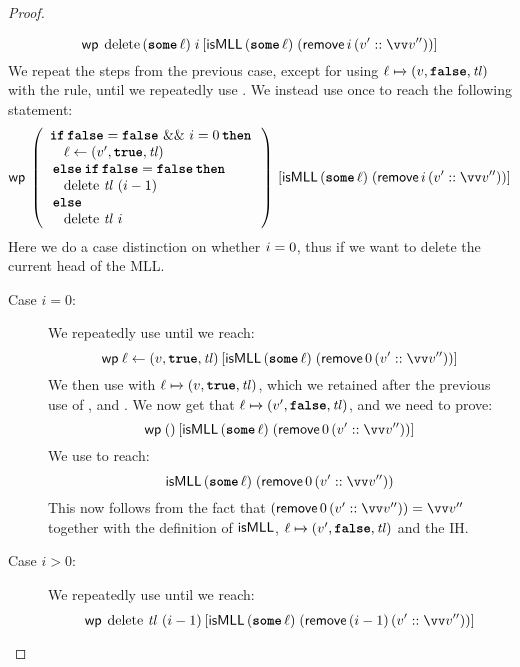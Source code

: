 \documentclass[thesis.tex]{subfiles}
\begin{document}
\begin{proof}
\begin{description}
      \[\wpre{\MLLdelete\, (\Some \loc)\; \iindex}{\isMLL\, (\Some \loc)\; (\textlog{remove}\, \iindex\, (\val' :: \vect{\val}''))}\]
      We repeat the steps from the previous case, except for using $\loc \fmapsto (\val, \False, \tl)$ with the  rule, until we repeatedly use . We instead use  once to reach the following statement:
      \[
        \wpre{\left(
          \begin{array}{l}
              \If \False = \False\ \&\&\ \iindex = 0 then \\
              \quad \loc \gets (\val', \True, \tl)        \\
              \Else \If \False = \False then              \\
              \quad \MLLdelete\,\tl\ (\iindex - 1)        \\
              \Else                                       \\
              \quad \MLLdelete\,\tl\ \iindex
            \end{array}
          \right)}{\isMLL\, (\Some \loc)\; (\textlog{remove}\, \iindex\, (\val' :: \vect{\val}''))}
      \]
      Here we do a case distinction on whether $i = 0$, thus if we want to delete the current head of the MLL.
      \begin{description}
        \item[Case $i = 0$:] We repeatedly use  until we reach:
          \[
            \wpre{\loc \gets (\val, \True, \tl)}{\isMLL\, (\Some \loc)\; (\textlog{remove}\, 0\, (\val' :: \vect{\val}''))}
          \]
          We then use  with $\loc \fmapsto (\val, \True, \tl)$, which we retained after the previous use of , and . We now get that $\loc \fmapsto (\val', \False, \tl)$, and we need to prove:
          \[
            \wpre{()}{\isMLL\, (\Some \loc)\; (\textlog{remove}\, 0\, (\val' :: \vect{\val}''))}
          \]
          We use  to reach:
          \[
            \isMLL\, (\Some \loc)\; (\textlog{remove}\, 0\, (\val' :: \vect{\val}''))
          \]
          This now follows from the fact that $(\textlog{remove}\, 0\, (\val' :: \vect{\val}'')) = \vect{\val}''$ together with the definition of $\textsf{\upshape isMLL}$, $\loc \fmapsto (\val', \False, \tl)$ and the IH.
        \item[Case $i > 0$:] We repeatedly use  until we reach:
          \[
            \wpre{\MLLdelete\,\tl\ (\iindex - 1)}{\isMLL\, (\Some \loc)\; (\textlog{remove}\, (\iindex - 1)\, (\val' :: \vect{\val}''))}
\]
\end{description}
\end{description}
\end{proof}
\end{document}

